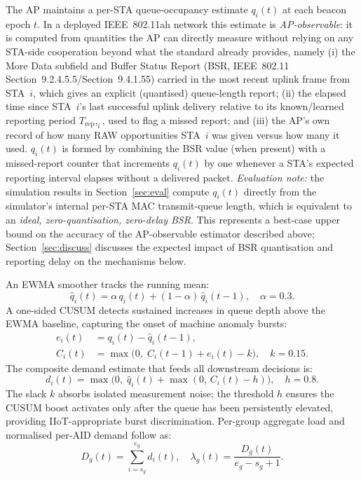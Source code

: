 \documentclass[journal]{IEEEtran}
\begin{document}
The AP maintains a per-STA queue-occupancy estimate $q_i(t)$ at each
beacon epoch $t$.
In a deployed IEEE~802.11ah network this estimate is
\emph{AP-observable}: it is computed from quantities the AP can
directly measure without relying on any STA-side cooperation beyond
what the standard already provides, namely
(i) the More Data subfield and Buffer Status Report (BSR, IEEE~802.11
Section~9.2.4.5.5/Section~9.4.1.55) carried in the most recent uplink frame from
STA~$i$, which gives an explicit (quantised) queue-length report;
(ii) the elapsed time since STA~$i$'s last successful uplink delivery
relative to its known/learned reporting period $T_\mathrm{rep},_i$,
used to flag a missed report; and
(iii) the AP's own record of how many RAW opportunities STA~$i$ was
given versus how many it used.
$q_i(t)$ is formed by combining the BSR value (when present) with a
missed-report counter that increments $q_i(t)$ by one whenever a STA's
expected reporting interval elapses without a delivered packet.
\emph{Evaluation note:} the simulation results in
Section~\ref{sec:eval} compute $q_i(t)$ directly from the simulator's
internal per-STA MAC transmit-queue length, which is equivalent to an
\emph{ideal, zero-quantisation, zero-delay BSR}.
This represents a best-case upper bound on the accuracy of the
AP-observable estimator described above; Section~\ref{sec:discuss}
discusses the expected impact of BSR quantisation and reporting delay
on the mechanisms below.

An EWMA smoother tracks the running mean:
\begin{equation}
  \hat{q}_i(t) = \alpha\,q_i(t) + (1-\alpha)\,\hat{q}_i(t-1),
  \quad \alpha=0.3.
  \label{eq:ewma}
\end{equation}
A one-sided CUSUM detects sustained increases in queue depth above the
EWMA baseline, capturing the onset of machine anomaly bursts:
\begin{align}
  e_i(t)  &= q_i(t) - \hat{q}_i(t-1), \label{eq:err}\\
  C_i(t)  &= \max\!\bigl(0,\;C_i(t-1)+e_i(t)-k\bigr),\quad k=0.15.
  \label{eq:cusum}
\end{align}
The composite demand estimate that feeds all downstream decisions is:
\begin{equation}
  d_i(t) = \max\!\bigl(0,\;\hat{q}_i(t)+\max(0,\,C_i(t)-h)\bigr),
  \quad h=0.8.
  \label{eq:demand}
\end{equation}
The slack $k$ absorbs isolated measurement noise; the threshold $h$
ensures the CUSUM boost activates only after the queue has been
persistently elevated, providing IIoT-appropriate burst discrimination.
Per-group aggregate load and normalised per-AID demand follow as:
\begin{equation}
  D_g(t) = \sum_{i=s_g}^{e_g} d_i(t), \quad
  \lambda_g(t) = \frac{D_g(t)}{e_g - s_g + 1}.
  \label{eq:groupload}
\end{equation}
\end{document}
